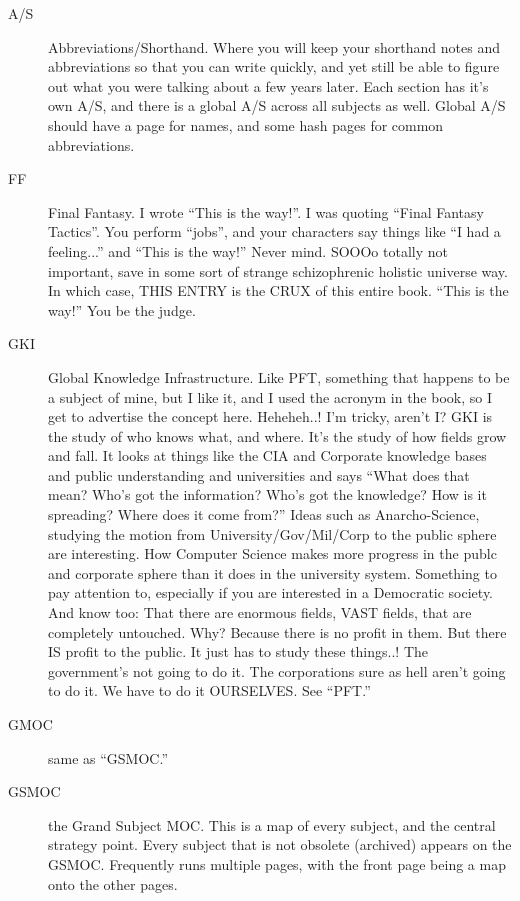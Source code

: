 \documentclass[oneside]{scrbook}
\begin{document}
\begin{description}
\item[A/S] Abbreviations/Shorthand. Where you will keep your shorthand
notes and abbreviations so that you can write quickly, and yet still
be able to figure out what you were talking about a few years
later. Each section has it's own A/S, and there is a global A/S across
all subjects as well. Global A/S should have a page for names, and
some hash pages for common abbreviations.

\item[FF] Final Fantasy. I wrote ``This is the way!''. I was quoting ``Final
Fantasy Tactics''. You perform ``jobs'', and your characters say things
like ``I had a feeling...'' and ``This is the way!'' Never mind. SOOOo
totally not important, save in some sort of strange schizophrenic
holistic universe way. In which case, THIS ENTRY is the CRUX of this
entire book. ``This is the way!'' You be the judge.

\item[GKI] Global Knowledge Infrastructure. Like PFT, something that
happens to be a subject of mine, but I like it, and I used the acronym
in the book, so I get to advertise the concept here. Heheheh..! I'm
tricky, aren't I? GKI is the study of who knows what, and where. It's
the study of how fields grow and fall. It looks at things like the CIA
and Corporate knowledge bases and public understanding and
universities and says ``What does that mean? Who's got the information?
Who's got the knowledge? How is it spreading? Where does it come
from?'' Ideas such as Anarcho-Science, studying the motion from
University/Gov/Mil/Corp to the public sphere are interesting. How
Computer Science makes more progress in the publc and corporate sphere
than it does in the university system. Something to pay attention to,
especially if you are interested in a Democratic society. And know
too: That there are enormous fields, VAST fields, that are completely
untouched. Why? Because there is no profit in them. But there IS
profit to the public. It just has to study these things..! The
government's not going to do it. The corporations sure as hell aren't
going to do it. We have to do it OURSELVES. See ``PFT.''

\item[GMOC] same as ``GSMOC.''

\item[GSMOC] the Grand Subject MOC. This is a map of every subject, and the
central strategy point. Every subject that is not obsolete (archived)
appears on the GSMOC. Frequently runs multiple pages, with the front
page being a map onto the other pages.


\end{description}
\end{document}
